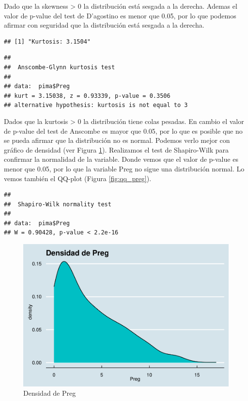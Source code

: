 \documentclass[
]{article}
\begin{document}
Dado que la skewness \textgreater{} 0 la distribución está sesgada a la
derecha. Ademas el valor de p-value del test de D'agostino es menor que
0.05, por lo que podemos afirmar con seguridad que la distribución está
sesgada a la derecha.

\begin{verbatim}
## [1] "Kurtosis: 3.1504"
\end{verbatim}

\begin{verbatim}
## 
##  Anscombe-Glynn kurtosis test
## 
## data:  pima$Preg
## kurt = 3.15038, z = 0.93339, p-value = 0.3506
## alternative hypothesis: kurtosis is not equal to 3
\end{verbatim}

Dados que la kurtosis \textgreater{} 0 la distribución tiene colas
pesadas. En cambio el valor de p-value del test de Anscombe es mayor que
0.05, por lo que es posible que no se pueda afirmar que la distribución
no es normal. Podemos verlo mejor con gráfico de densidad (ver Figura
\ref{fig:densidad_preg}). Realizamos el test de Shapiro-Wilk para
confirmar la normalidad de la variable. Donde vemos que el valor de
p-value es menor que 0.05, por lo que la variable Preg no sigue una
distribución normal. Lo vemos también el QQ-plot (Figura
\ref{fig:qq_preg}).

\begin{verbatim}
## 
##  Shapiro-Wilk normality test
## 
## data:  pima$Preg
## W = 0.90428, p-value < 2.2e-16
\end{verbatim}

\begin{figure}

{\centering \includegraphics[width=0.5\linewidth]{pima-clasificacion_files/figure-latex/densidad_preg-1} 

}

\caption{Densidad de Preg}\label{fig:densidad_preg}
\end{figure}
\end{document}
